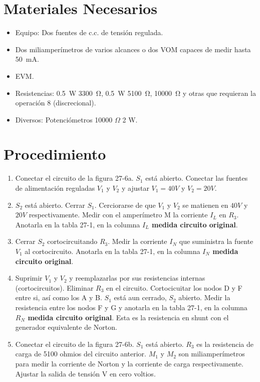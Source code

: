 \section{Materiales Necesarios}
\begin{itemize}
    \item Equipo: Dos fuentes de c.c. de tensión regulada.
    \item Dos miliamperímetros de varios alcances o dos VOM capaces de 
    medir hasta \SI{50}{\milli\ampere}.
    \item EVM.
    \item Resistencias: \SI{0.5}{\watt} \SI{3300}{\ohm}, \SI{0.5}{\watt} 
    \SI{5100}{\ohm}, \SI{10000}{\ohm} y otras que requieran la operación 8 (discrecional).
    \item Diversos: Potenciómetros 10000 $\Omega$ 2 W.
\end{itemize}

\section{Procedimiento}
\begin{enumerate}[series=procedimientolist]
    \item Conectar el circuito de la figura 27-6a. $S_1$ está abierto. 
    Conectar las fuentes de alimentación reguladas $V_1$ y $V_2$ y 
    ajustar $V_1=40 V$ y $V_2=20 V$. 
    \item $S_2$ está abierto. Cerrar $S_1$. Cerciorarse de que $V_1$ y 
    $V_2$ se matienen en $40 V$ y $20 V$ respectivamente. Medir con el 
    amperímetro M la corriente $I_L$ en $R_3$. Anotarla en la tabla 27-1, en 
    la columna \textbf{$I_L$ medida circuito original}.
    \item Cerrar $S_2$ cortocircuitando $R_3$. Medir la corriente $I_N$ que 
    suministra la fuente $V_1$ al cortocircuito. Anotarla en la tabla 27-1, en la 
    columna \textbf{$I_N$ medida circuito original}.
    \item Suprimir $V_1$ y $V_2$ y reemplazarlas por sus resistencias internas 
    (cortocircuitos). Eliminar $R_3$ en el circuito. Cortocicuitar los nodos 
    D y F entre si, así como los A y B. $S_1$ está aun cerrado, $S_2$ abierto. 
    Medir la resistencia entre los nodos F y G y anotarla en la tabla 27-1, en la 
    columna \textbf{$R_N$ medida circuito original}. Esta es la resistencia en shunt 
    con el generador equivalente de Norton.
    \item Conectar el circuito de la figura 27-6b. $S_1$ está abierto. 
    $R_3$ es la resistencia de carga de 5100 ohmios del circuito anterior. 
    $M_1$ y $M_2$ son miliamperímetros para medir la corriente de Norton 
    y la corriente de carga respectivamente. Ajustar la salida de tensión 
    V en cero voltios.
\end{enumerate}